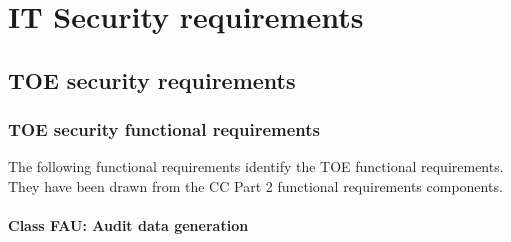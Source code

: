 \documentclass[12pt,english]{scrbook}
\begin{document}



\chapter{IT Security requirements}





\section{TOE security requirements}





\subsection{TOE security functional requirements}

The following functional requirements identify the TOE functional requirements.
They have been drawn from the CC Part 2 functional requirements components.





\subsubsection{Class FAU: Audit data generation}


\end{document}
